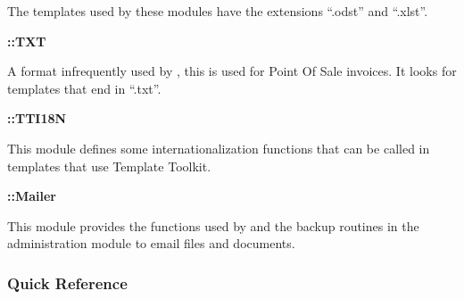 The templates used by these modules have the extensions ``.odst'' and
``.xlst''.

\textbf{\lsmbt::TXT}

A format infrequently used by \lsmb, this is used for Point Of Sale invoices.
It looks for templates that end in ``.txt''.

\textbf{\lsmbt::TTI18N}

This module defines some internationalization functions that can be called in
templates that use Template Toolkit.

\textbf{\lsmb::Mailer}

This module provides the functions used by \lsmbt{ }and the backup routines
in the administration module to email files and documents.

\subsubsection{Quick Reference}
\label{subsec-company-config-templates-quick}

